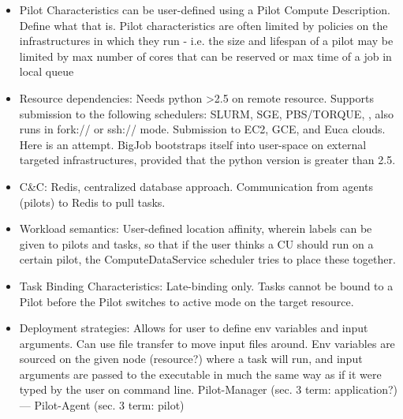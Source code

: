 \documentclass{sig-alternate}
\begin{document}
\begin{itemize}
\item Pilot Characteristics can be user-defined using a
Pilot Compute Description. Define what that is.
Pilot characteristics are often limited by policies on the infrastructures
in which they run - i.e. the size and lifespan of a
pilot may be limited by max number of cores
that can be reserved or max time of a job in local queue

\item Resource dependencies: Needs python >2.5 on remote resource. Supports submission to the following schedulers: SLURM, SGE, PBS/TORQUE, , also runs in fork:// or ssh:// mode. Submission to EC2, GCE, and Euca clouds. Here is an attempt.
BigJob bootstraps itself into user-space on external targeted
infrastructures, provided that the python version is greater than 2.5.

\item C\&C: Redis, centralized database approach. Communication from agents (pilots) to
Redis to pull tasks.

\item Workload semantics: User-defined location affinity, wherein labels
can be given to pilots and tasks, so that if the user thinks a CU
should run on a certain pilot, the ComputeDataService scheduler
tries to place these together.

\item Task Binding Characteristics: Late-binding only.
Tasks cannot be bound to a Pilot before the Pilot switches to active mode on the target
resource.  

\item Deployment strategies: Allows for user to define env variables and input arguments.
Can use file transfer to move input files around. Env variables are sourced
on the given node (resource?) where a task will run, and input arguments
are passed to the executable in much the same way as if it were typed
by the user on command line. Pilot-Manager (sec. 3 term: application?)
--- Pilot-Agent (sec. 3 term: pilot)
\end{itemize}
\end{document}

